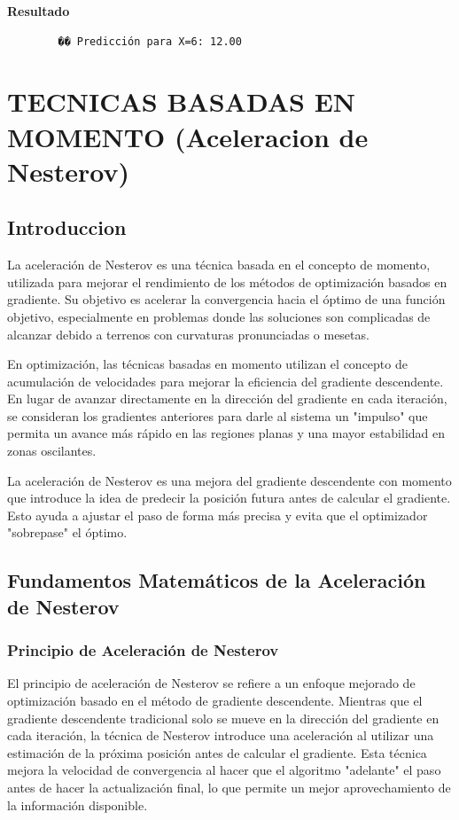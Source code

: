 \documentclass{article}
\begin{document}
	\textbf{Resultado}
	\begin{verbatim}
		�� Predicción para X=6: 12.00
	\end{verbatim}
	
	\section{TECNICAS BASADAS EN MOMENTO (Aceleracion de Nesterov)}
	
	\subsection{Introduccion}
	
	La aceleración de Nesterov es una técnica basada en el concepto de momento, utilizada para mejorar el rendimiento de los métodos de optimización basados en gradiente. Su objetivo es acelerar la convergencia hacia el óptimo de una función objetivo, especialmente en problemas donde las soluciones son complicadas de alcanzar debido a terrenos con curvaturas pronunciadas o mesetas.
	
	En optimización, las técnicas basadas en momento utilizan el concepto de acumulación de velocidades para mejorar la eficiencia del gradiente descendente. En lugar de avanzar directamente en la dirección del gradiente en cada iteración, se consideran los gradientes anteriores para darle al sistema un "impulso" que permita un avance más rápido en las regiones planas y una mayor estabilidad en zonas oscilantes.
	
	La aceleración de Nesterov es una mejora del gradiente descendente con momento que introduce la idea de predecir la posición futura antes de calcular el gradiente. Esto ayuda a ajustar el paso de forma más precisa y evita que el optimizador "sobrepase" el óptimo.
	
	\subsection{Fundamentos Matemáticos de la Aceleración de Nesterov}
	
	\subsubsection{Principio de Aceleración de Nesterov}
	
	El principio de aceleración de Nesterov se refiere a un enfoque mejorado de optimización basado en el método de gradiente descendente. Mientras que el gradiente descendente tradicional solo se mueve en la dirección del gradiente en cada iteración, la técnica de Nesterov introduce una aceleración al utilizar una estimación de la próxima posición antes de calcular el gradiente. Esta técnica mejora la velocidad de convergencia al hacer que el algoritmo "adelante" el paso antes de hacer la actualización final, lo que permite un mejor aprovechamiento de la información disponible.
	
\end{document}

